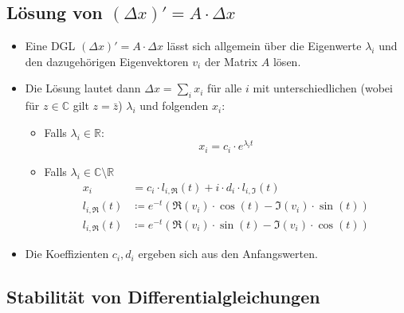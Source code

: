 		\subsection{Lösung von \( (\Delta x)' = A \cdot \Delta x \)} %
			\begin{itemize}
				\item Eine DGL \( (\Delta x)' = A \cdot \Delta x \) lässt sich allgemein über die Eigenwerte \( \lambda _ i \) und den dazugehörigen Eigenvektoren \( v _ i \) der Matrix \(A\) lösen.
				\item Die Lösung lautet dann \( \Delta x = \sum _ i x _ i \) für alle \( i \) mit unterschiedlichen (wobei für \( z \in \mathbb{C} \) gilt \( z = \bar{z} \)) \( \lambda _ i \) und folgenden \( x _ i \):
					\begin{itemize}
						\item Falls \( \lambda _ i \in \mathbb{R} \):
							\begin{equation*}
								x _ i = c _ i \cdot e ^ { \lambda _ i t }
							\end{equation*}
						\item Falls \( \lambda _ i \in \mathbb{C} \setminus \mathbb{R} \)
							\begin{align*}
								x _ i              & = c _ i \cdot l _ { i, \Re } (t) + i \cdot d _ i \cdot l _ { i, \Im } (t) \\
								l _ { i, \Re } (t) & \coloneqq e ^ {-t} (\Re(v _ i) \cdot \cos(t) - \Im(v _ i) \cdot \sin(t))  \\
								l _ { i, \Re } (t) & \coloneqq e ^ {-t} (\Re(v _ i) \cdot \sin(t) - \Im(v _ i) \cdot \cos(t))
							\end{align*}
					\end{itemize}
				\item Die Koeffizienten \( c _ i, d _ i \) ergeben sich aus den Anfangswerten.
			\end{itemize}

		\subsection{Stabilität von Differentialgleichungen} %
			\label{sec:stabilitydgl}

